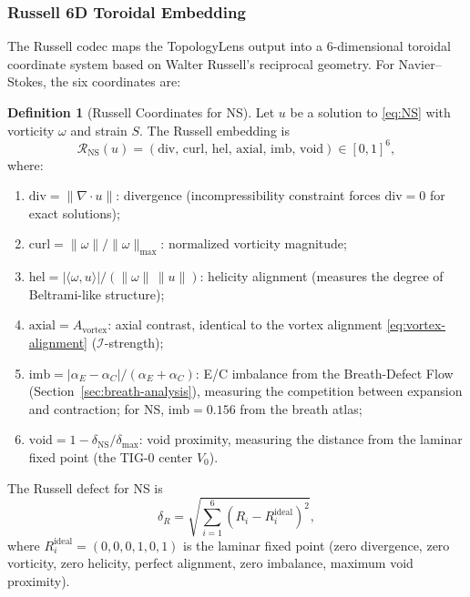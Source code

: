 \documentclass[11pt]{article}
\theoremstyle{definition}
\newtheorem{definition}[theorem]{Definition}
\theoremstyle{remark}
\begin{document}
\subsubsection{Russell 6D Toroidal Embedding}
\label{sec:russell-embedding}

The Russell codec maps the TopologyLens output into a 6-dimensional toroidal
coordinate system based on Walter Russell's reciprocal geometry.  For
Navier--Stokes, the six coordinates are:

\begin{definition}[Russell Coordinates for NS]
\label{def:russell-ns}
Let $u$ be a solution to \eqref{eq:NS} with vorticity $\omega$ and strain $S$.
The Russell embedding is
\begin{equation}\label{eq:russell-coords}
  \mathcal{R}_{\mathrm{NS}}(u) = (\mathrm{div},\, \mathrm{curl},\, \mathrm{hel},\,
  \mathrm{axial},\, \mathrm{imb},\, \mathrm{void}) \in [0,1]^6,
\end{equation}
where:
\begin{enumerate}[nosep]
  \item $\mathrm{div} = \|\nabla \cdot u\|$: divergence (incompressibility
    constraint forces $\mathrm{div} = 0$ for exact solutions);
  \item $\mathrm{curl} = \|\omega\| / \|\omega\|_{\max}$: normalized vorticity
    magnitude;
  \item $\mathrm{hel} = |\langle \omega, u\rangle| / (\|\omega\|\,\|u\|)$:
    helicity alignment (measures the degree of Beltrami-like structure);
  \item $\mathrm{axial} = A_{\mathrm{vortex}}$: axial contrast, identical to
    the vortex alignment \eqref{eq:vortex-alignment} ($\mathcal{I}$-strength);
  \item $\mathrm{imb} = |\alpha_E - \alpha_C| / (\alpha_E + \alpha_C)$: E/C
    imbalance from the Breath-Defect Flow (Section~\ref{sec:breath-analysis}),
    measuring the competition between expansion and contraction; for NS,
    $\mathrm{imb} = 0.156$ from the breath atlas;
  \item $\mathrm{void} = 1 - \delta_{\mathrm{NS}} / \delta_{\max}$:
    void proximity, measuring the distance from the laminar fixed point
    (the TIG-0 center $V_0$).
\end{enumerate}
\end{definition}

The Russell defect for NS is
\begin{equation}\label{eq:russell-defect}
  \delta_R = \sqrt{\sum_{i=1}^{6} (R_i - R_i^{\mathrm{ideal}})^2},
\end{equation}
where $R_i^{\mathrm{ideal}} = (0, 0, 0, 1, 0, 1)$ is the laminar fixed point
(zero divergence, zero vorticity, zero helicity, perfect alignment, zero
imbalance, maximum void proximity).
\end{document}

